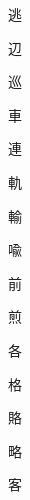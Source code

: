 \begin{spacing}{2.5}
{\Huge \begin{CJK}{UTF8}{min} 逃\end{CJK}}\hspace{0.1cm}
{\Huge \begin{CJK}{UTF8}{min} 辺\end{CJK}}\hspace{0.1cm}
{\Huge \begin{CJK}{UTF8}{min} 巡\end{CJK}}\hspace{0.1cm}
{\Huge \begin{CJK}{UTF8}{min} 車\end{CJK}}\hspace{0.1cm}
{\Huge \begin{CJK}{UTF8}{min} 連\end{CJK}}\hspace{0.1cm}
{\Huge \begin{CJK}{UTF8}{min} 軌\end{CJK}}\hspace{0.1cm}
{\Huge \begin{CJK}{UTF8}{min} 輸\end{CJK}}\hspace{0.1cm}
{\Huge \begin{CJK}{UTF8}{min} 喩\end{CJK}}\hspace{0.1cm}
{\Huge \begin{CJK}{UTF8}{min} 前\end{CJK}}\hspace{0.1cm}
{\Huge \begin{CJK}{UTF8}{min} 煎\end{CJK}}\hspace{0.1cm}
{\Huge \begin{CJK}{UTF8}{min} 各\end{CJK}}\hspace{0.1cm}
{\Huge \begin{CJK}{UTF8}{min} 格\end{CJK}}\hspace{0.1cm}
{\Huge \begin{CJK}{UTF8}{min} 賂\end{CJK}}\hspace{0.1cm}
{\Huge \begin{CJK}{UTF8}{min} 略\end{CJK}}\hspace{0.1cm}
{\Huge \begin{CJK}{UTF8}{min} 客\end{CJK}}\hspace{0.1cm}

\end{spacing}
